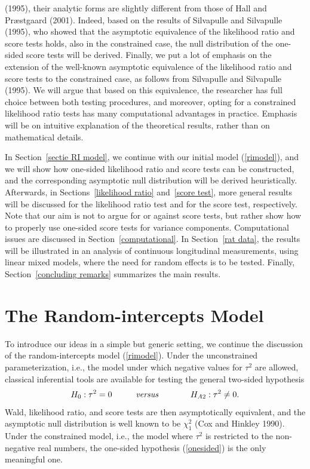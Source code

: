 \documentclass[useAMS,usenatbib,referee]{biom}
\begin{document}
(1995), their analytic forms are slightly different from those of Hall
and Pr{\ae}stgaard (2001). Indeed, based on the results of Silvapulle
and Silvapulle (1995), who showed that the asymptotic equivalence of
the likelihood ratio and score tests holds, also in the constrained
case, the null distribution of the one-sided score tests will be
derived.  Finally, we put a lot of emphasis on the extension of the
well-known asymptotic equivalence of the likelihood ratio and score
tests to the constrained case, as follows from Silvapulle and
Silvapulle (1995). We will argue that based on this equivalence, the
researcher has full choice between both testing procedures, and
moreover, opting for a constrained likelihood ratio tests has many
computational advantages in practice.  Emphasis will be on intuitive
explanation of the theoretical results, rather than on mathematical
details.

In Section~\ref{sectie RI model}, we continue with our initial model
(\ref{rimodel}), and we will show how one-sided likelihood ratio and
score tests can be constructed, and the corresponding asymptotic null
distribution will be derived heuristically. Afterwards, in
Sections~\ref{likelihood ratio} and~\ref{score test}, more general
results will be discussed for the likelihood ratio test and for the
score test, respectively.  Note that our aim is not to argue for or
against score tests, but rather show how to properly use one-sided
score tests for variance components. Computational issues are
discussed in Section~\ref{computational}.  In Section~\ref{rat data},
the results will be illustrated in an analysis of continuous
longitudinal measurements, using linear mixed models, where the need
for random effects is to be tested. Finally, Section~\ref{concluding
remarks} summarizes the main results.


\section{The Random-intercepts Model\label{sectie RI model}}

To introduce our ideas in a simple but generic setting, we continue
the discussion of the random-intercepts model (\ref{rimodel}).  Under
the unconstrained parameterization, i.e., the model under which
negative values for $\tau^2$ are allowed, classical inferential tools
are available for testing the general two-sided hypothesis
\begin{eqnarray*}
H_0:\tau^2=0 \hspace*{1cm} &\mbox{\em versus}& \hspace*{1cm}
H_{A2}:\tau^2\ne 0.
\end{eqnarray*}
Wald, likelihood ratio, and score tests are then asymptotically
equivalent, and the asymptotic null distribution is well known to be
$\chi^2_1$ (Cox and Hinkley 1990).  Under the constrained model, i.e.,
the model where $\tau^2$ is restricted to the non-negative real
numbers, the one-sided hypothesis (\ref{onesided}) is the only
meaningful one.
\end{document}
